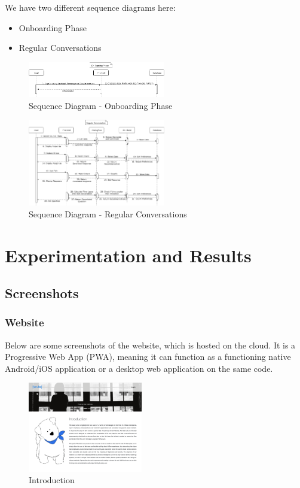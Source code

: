 \documentclass[conference,compsoc]{IEEEtran}
\begin{document}
We have two different sequence diagrams here:
\begin{itemize}
    \item Onboarding Phase
    \item Regular Conversations
\end{itemize}

\begin{figure}[H]
    \centering
    \includegraphics[width=6cm]{images/sequence-diagram-onboarding-phase.png}
    \caption{Sequence Diagram - Onboarding Phase}
\end{figure}

\begin{figure}[H]
    \centering
    \includegraphics[width=6cm]{images/sequence-diagram-regular-conversations.png}
    \caption{Sequence Diagram - Regular Conversations}
\end{figure}


\section{Experimentation and Results}

\subsection{Screenshots}

\subsubsection{Website}

\noindent
Below are some screenshots of the website, which is hosted on the cloud. It is a Progressive Web App (PWA), meaning it can function as a functioning native Android/iOS application or a desktop web application on the same code.

\begin{figure}[H]
    \centering
    \includegraphics[width=5cm]{images/screenshots/website/website-introduction.png}
    \caption{Introduction}
\end{figure}
\end{document}
